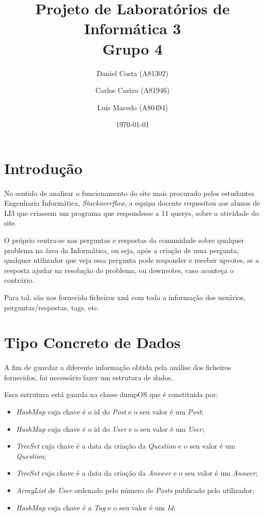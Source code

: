 \documentclass[a4paper, 10pt]{article}
\title{Projeto de Laboratórios de Informática 3\\Grupo 4}
\author{Daniel Costa (A81302) \and Carlos Castro (A81946) \and Luís Macedo (A80494)}
\date{\today}
\begin{document}
\maketitle

\section{Introdução}
\label{sec:intro}

\paragraph{ }
No sentido de analisar o funcionamento do site mais procurado pelos
estudantes Engenharia Informática, \emph{Stackoverflow}, a equipa docente
requesitou aos alunos de LI3 que criassem um programa que respondesse
a 11 querys, sobre a atividade do site.

O próprio centra-se nas perguntas e respostas da comunidade sobre qualquer problema na área da Informática, ou seja, após a criação de uma pergunta, qualquer utilizador que veja essa pergunta pode responder e receber upvotes, se a resposta ajudar na resolução do problema, ou downvotes, caso aconteça o contrário.

Para tal, são nos fornecido ficheiros xml com toda a informação dos usuários, perguntas/respostas, tags, etc.

\section{Tipo Concreto de Dados}
\label{sec:TCD}

\paragraph{ }

A fim de guardar a diferente informação obtida pela análise dos ficheiros fornecidos, foi necessário fazer um estrutura de dados.

Essa estrutura está guarda na classe dumpOS que é constituida por:
\begin{itemize}
    \item \emph{HashMap} cuja chave é o id do \emph{Post} e o seu valor é um \emph{Post};
    \item \emph{HashMap} cuja chave é o id do \emph{User} e o seu valor é um \emph{User};
    \item \emph{TreeSet} cuja chave é a data da criação da \emph{Question} e o seu valor é um \emph{Question};
    \item \emph{TreeSet} cuja chave é a data da criação da \emph{Answer} e o seu valor é um \emph{Answer};
    \item \emph{ArrayList} de \emph{User} ordenado pelo número de \emph{Posts} publicado pelo utilizador;
    \item \emph{HashMap} cuja chave é a \emph{Tag} e o seu valor é um \emph{Id};
\end{itemize}
\end{document}
